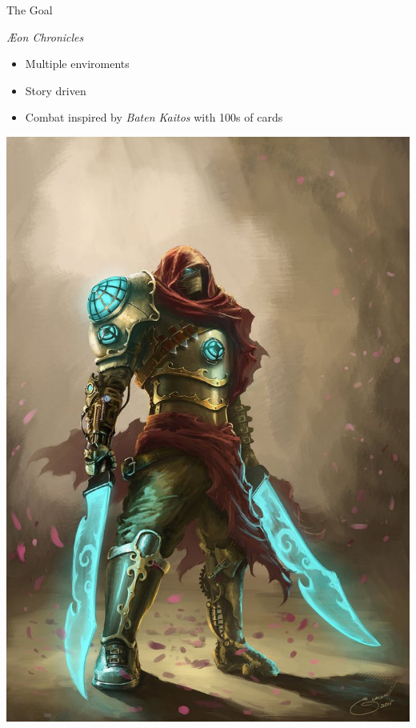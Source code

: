 \documentclass{../teamepsilon}
\title{\aeon}
\author{\te}
\institute{Colorado School of Mines}
\newcommand\aeon{\textit{\AE on Chronicles}\xspace}
\begin{document}
\begin{frame}{The Goal}
    \begin{minipage}{0.55\textwidth}
        \aeon
        \begin{itemize}
            \item Multiple enviroments
            \item Story driven
            \item Combat inspired by \textit{Baten Kaitos} with 100s of cards
        \end{itemize}
    \end{minipage}%
    \begin{minipage}{0.45\textwidth}
        \includegraphics[scale=0.15]{../graphics/warrior}
    \end{minipage}
\end{frame}
\end{document}
